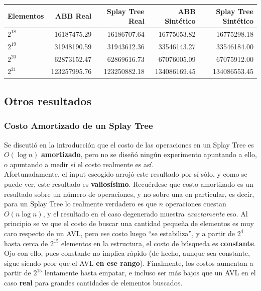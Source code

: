\documentclass[12pt,letterpaper]{report}
\begin{document}
\begin{center}
  \begin{tabular}{|l|r|r|r|r|}
    \hline
    Elementos & ABB Real & Splay Tree Real & ABB Sintético & Splay Tree Sintético\\ \hline
    $2^{18}$ & 16187475.29 & 16186707.64 & 16775053.82 & 16775298.18 \\ \hline
    $2^{19}$ & 31948190.59 & 31943612.36 & 33546143.27 & 33546184.00 \\ \hline
    $2^{20}$ & 62873152.47 & 62869616.73 & 67076005.09 & 67075912.00 \\ \hline
    $2^{21}$ & 123257995.76 & 123250882.18 & 134086169.45 & 134086553.45 \\ \hline
  \end{tabular}
\end{center}

\subsection{Otros resultados}
\label{subsec:analisis_misc}
\subsubsection{Costo Amortizado de un Splay Tree}
Se discutió en la introducción que el costo de las operaciones en un Splay Tree es $O(\log n)$ \textbf{amortizado}, pero no se diseñó ningún experimento apuntando a ello, o apuntando a medir si el costo realmente es así.\\

Afortunadamente, el input escogido arrojó este resultado por sí sólo, y como se puede ver, este resultado es \textbf{valiosísimo}. Recuérdese que costo amortizado es un resultado sobre un número de operaciones, y no sobre una en particular, es decir, para un Splay Tree lo realmente verdadero es que $n$ operaciones cuestan $O(n\log n)$, y el resultado en el caso degenerado muestra \emph{exactamente} eso. Al principio se ve que el costo de buscar una cantidad pequeña de elementos es muy caro respecto de un AVL, pero ese costo luego ``se estabiliza'', y a partir de $2^4$ hasta cerca de $2^{15}$ elementos en la estructura, el costo de búsqueda es \textbf{constante}. Ojo con ello, pues constante no implica rápido (de hecho, aunque sea constante, sigue siendo peor que el AVL \textbf{en ese rango}). Finalmente, los costos aumentan a partir de $2^{15}$ lentamente hasta empatar, e incluso ser más bajos que un AVL en el caso \textbf{real} para grandes cantidades de elementos buscados.\\
\end{document}
